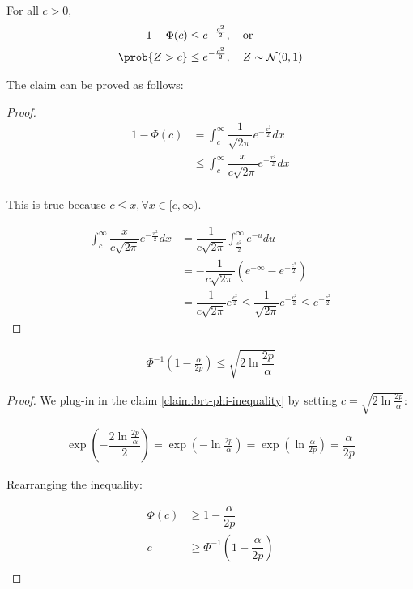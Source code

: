 \begin{claim}
\label{claim:brt-phi-inequality}
For all $c > 0$,
\begin{align*}
    1 - \Phi(c) &\leq e^{- \frac{c^2}{2}}, \quad \text{or}\\
    \prob{Z > c} &\leq e^{- \frac{c^2}{2}}, \quad Z \sim \mathcal{N}(0, 1)
\end{align*}
\end{claim}

The claim can be proved as follows:

\begin{proof}
\begin{align*}
    1 - \Phi(c) &= \int_{c}^{\infty} \dfrac{1}{\sqrt{2\pi}} e^{-\frac{x^2}{2}} dx\\
    &\leq \int_{c}^{\infty} \dfrac{x}{c\sqrt{2\pi}} e^{-\frac{x^2}{2}} dx\\
\end{align*}

This is true because $c \leq x, \forall x \in [c, \infty)$.

\begin{align*}
\int_{c}^{\infty} \dfrac{x}{c\sqrt{2\pi}} e^{-\frac{x^2}{2}} dx
&=
\dfrac{1}{c\sqrt{2\pi}} \int_{\frac{c^2}{2}}^{\infty} e^{-u} du\\
&= -\dfrac{1}{c\sqrt{2\pi}} \left(e^{-\infty} - e^{-\frac{c^2}{2}}\right)\\
&= \dfrac{1}{c\sqrt{2 \pi}} e^{\frac{c^2}{2}}
\leq \dfrac{1}{\sqrt{2 \pi}} e^{-\frac{c^2}{2}}
\leq  e^{-\frac{c^2}{2}}
\end{align*}
\end{proof}

\begin{lemma}
\label{lemma:brt-size-inequality}
\begin{align*}
    \Phi^{-1}(1 - \frac{\alpha}{2p}) \leq \sqrt{2 \ln{\dfrac{2p}{\alpha}}}
\end{align*}
\end{lemma}

\begin{proof}
We plug-in in the claim \ref{claim:brt-phi-inequality} by setting $c = \sqrt{2 \ln \frac{2p}{\alpha}}$:

\begin{align*}
    \exp \left(-\dfrac{2 \ln \frac{2p}{\alpha}}{2}\right)
    = 
    \exp \left(- \ln \frac{2p}{\alpha}\right)
    = 
    \exp \left(\ln \frac{\alpha}{2p}\right)
    =
    \dfrac{\alpha}{2p}
\end{align*}

Rearranging the inequality:

\begin{align*}
    \Phi(c) &\geq 1 - \dfrac{\alpha}{2p}\\
    c &\geq \Phi^{-1}\left(1 - \dfrac{\alpha}{2p}\right)\\
\end{align*}
\end{proof}

